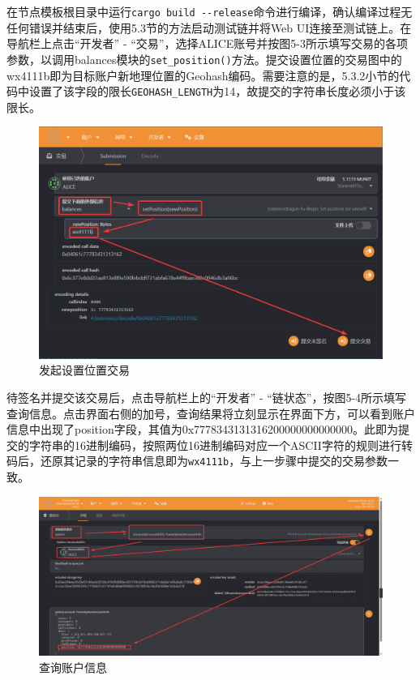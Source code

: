 在节点模板根目录中运行\verb|cargo build --release|命令进行编译，确认编译过程无任何错误并结束后，使用5.3节的方法启动测试链并将Web UI连接至测试链上。在导航栏上点击“开发者” - “交易”，选择ALICE账号并按图5-3所示填写交易的各项参数，以调用balances模块的\verb|set_position()|方法。提交设置位置的交易图中的wx4111b即为目标账户新地理位置的Geohash编码。需要注意的是，5.3.2小节的代码中设置了该字段的限长\verb|GEOHASH_LENGTH|为14，故提交的字符串长度必须小于该限长。

\begin{figure}[htbp]
    \centering
    \includegraphics[width=\textwidth]{images/setPos.png}
    \caption{发起设置位置交易}\label{发起设置位置交易} %
\end{figure}

待签名并提交该交易后，点击导航栏上的“开发者” - “链状态”，按图5-4所示填写查询信息。点击界面右侧的加号，查询结果将立刻显示在界面下方，可以看到账户信息中出现了position字段，其值为0x7778343131316200000000000000。此即为提交的字符串的16进制编码，按照两位16进制编码对应一个ASCII字符的规则进行转码后，还原其记录的字符串信息即为\verb|wx4111b|，与上一步骤中提交的交易参数一致。

\begin{figure}[htbp]
    \centering
    \includegraphics[width=\textwidth]{images/watchAccInfo.png}
    \caption{查询账户信息}\label{查询账户信息} %
\end{figure}

